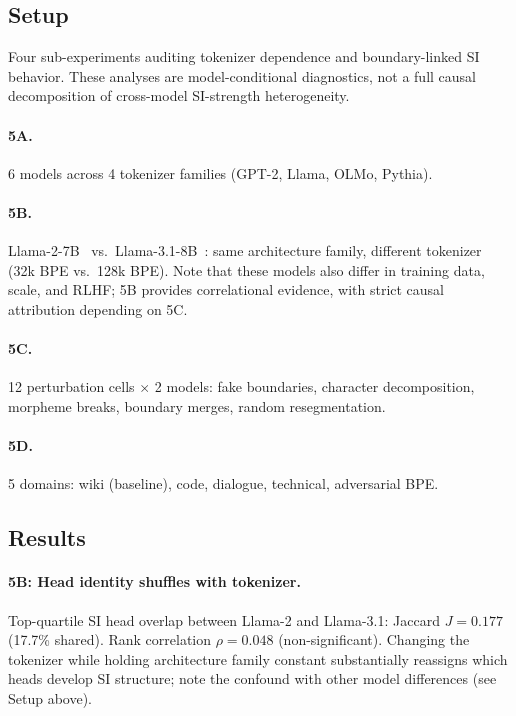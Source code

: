\documentclass{article}
\begin{document}
\subsection{Setup}

Four sub-experiments auditing tokenizer dependence and boundary-linked SI behavior.
These analyses are model-conditional diagnostics, not a full causal decomposition of
cross-model SI-strength heterogeneity.

\paragraph{5A.} 6 models across 4 tokenizer families (GPT-2, Llama, OLMo, Pythia).

\paragraph{5B.} Llama-2-7B~\citep{touvron2023llama2} vs.\ Llama-3.1-8B~\citep{dubey2024llama3}:
same architecture family, different tokenizer (32k BPE vs.\ 128k BPE). Note that these
models also differ in training data, scale, and RLHF; 5B provides correlational evidence,
with strict causal attribution depending on 5C.

\paragraph{5C.} 12 perturbation cells $\times$ 2 models: fake boundaries, character
decomposition, morpheme breaks, boundary merges, random resegmentation.

\paragraph{5D.} 5 domains: wiki (baseline), code, dialogue, technical, adversarial BPE.

\subsection{Results}

\paragraph{5B: Head identity shuffles with tokenizer.} Top-quartile SI head overlap between
Llama-2 and Llama-3.1: Jaccard $J = 0.177$ (17.7\% shared). Rank correlation $\rho = 0.048$
(non-significant). Changing the tokenizer while holding architecture family constant
substantially reassigns which heads develop SI structure; note the confound with other
model differences (see Setup above).
\end{document}
